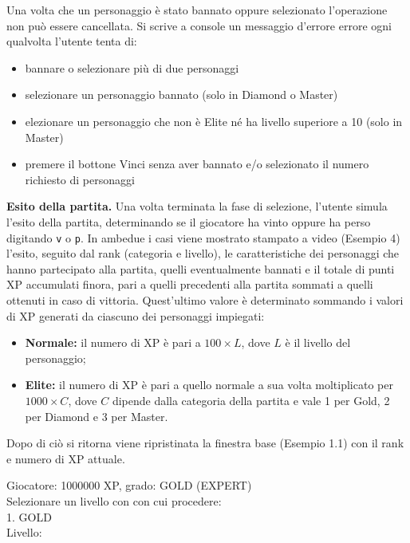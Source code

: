 \documentclass{article}
\begin{document}
Una volta che un personaggio è stato bannato oppure selezionato l'operazione non può essere cancellata. Si scrive a console un messaggio d'errore errore ogni qualvolta l'utente tenta di: 
\begin{itemize}
    \item bannare o selezionare più di due personaggi
    \item selezionare un personaggio bannato (solo in Diamond o Master)
    \item elezionare un personaggio che non è Elite né ha livello superiore a 10 (solo in Master)
    \item premere il bottone Vinci senza aver bannato e/o selezionato il numero richiesto di personaggi
\end{itemize}

\textbf{Esito della partita.} Una volta terminata la fase di selezione, l'utente simula l'esito della partita, determinando se il giocatore ha vinto oppure ha perso digitando \texttt{v} o \texttt{p}. In ambedue i casi viene mostrato stampato a video (Esempio 4) l'esito, seguito dal rank (categoria e livello), le caratteristiche dei personaggi che hanno partecipato alla partita, quelli eventualmente bannati e il totale di punti XP accumulati finora, pari a quelli precedenti alla partita sommati a quelli ottenuti in caso di vittoria. Quest'ultimo valore è determinato sommando i valori di XP generati da ciascuno dei personaggi impiegati:
\begin{itemize}
    \item \textbf{Normale:} il numero di XP è pari a \(100 \times L\), dove \(L\) è il livello del personaggio;
    \item \textbf{Elite:} il numero di XP è pari a quello normale a sua volta moltiplicato per \(1000 \times C\), dove \(C\) dipende dalla categoria della partita e vale 1 per Gold, 2 per Diamond e 3 per Master.
\end{itemize}
Dopo di ciò si ritorna viene ripristinata la finestra base (Esempio 1.1) con il rank e numero di XP attuale.

\newpage

\begin{tcolorbox}[
    title=Esempio 1
]
Giocatore: 1000000 XP, grado: GOLD (EXPERT) \\
Selezionare un livello con con cui procedere: \\
1. GOLD \\
Livello: 
\end{tcolorbox}
\end{document}
